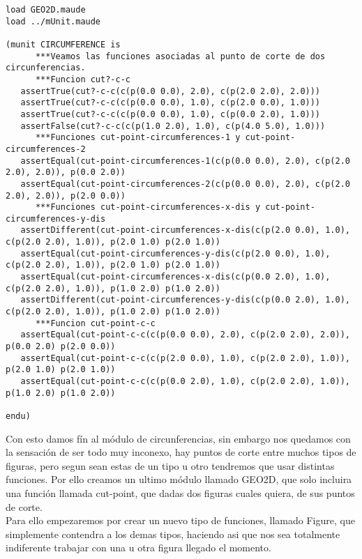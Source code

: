 \begin{verbatim}
load GEO2D.maude
load ../mUnit.maude

(munit CIRCUMFERENCE is 
      ***Veamos las funciones asociadas al punto de corte de dos circunferencias.
      ***Funcion cut?-c-c
   assertTrue(cut?-c-c(c(p(0.0 0.0), 2.0), c(p(2.0 2.0), 2.0)))
   assertTrue(cut?-c-c(c(p(0.0 0.0), 1.0), c(p(2.0 0.0), 1.0)))
   assertTrue(cut?-c-c(c(p(0.0 0.0), 1.0), c(p(0.0 2.0), 1.0)))
   assertFalse(cut?-c-c(c(p(1.0 2.0), 1.0), c(p(4.0 5.0), 1.0)))
      ***Funciones cut-point-circumferences-1 y cut-point-circumferences-2
   assertEqual(cut-point-circumferences-1(c(p(0.0 0.0), 2.0), c(p(2.0 2.0), 2.0)), p(0.0 2.0))
   assertEqual(cut-point-circumferences-2(c(p(0.0 0.0), 2.0), c(p(2.0 2.0), 2.0)), p(2.0 0.0))
      ***Funciones cut-point-circumferences-x-dis y cut-point-circumferences-y-dis
   assertDifferent(cut-point-circumferences-x-dis(c(p(2.0 0.0), 1.0), c(p(2.0 2.0), 1.0)), p(2.0 1.0) p(2.0 1.0))
   assertEqual(cut-point-circumferences-y-dis(c(p(2.0 0.0), 1.0), c(p(2.0 2.0), 1.0)), p(2.0 1.0) p(2.0 1.0))
   assertEqual(cut-point-circumferences-x-dis(c(p(0.0 2.0), 1.0), c(p(2.0 2.0), 1.0)), p(1.0 2.0) p(1.0 2.0))
   assertDifferent(cut-point-circumferences-y-dis(c(p(0.0 2.0), 1.0), c(p(2.0 2.0), 1.0)), p(1.0 2.0) p(1.0 2.0))
      ***Funcion cut-point-c-c
   assertEqual(cut-point-c-c(c(p(0.0 0.0), 2.0), c(p(2.0 2.0), 2.0)), p(0.0 2.0) p(2.0 0.0))
   assertEqual(cut-point-c-c(c(p(2.0 0.0), 1.0), c(p(2.0 2.0), 1.0)), p(2.0 1.0) p(2.0 1.0))
   assertEqual(cut-point-c-c(c(p(0.0 2.0), 1.0), c(p(2.0 2.0), 1.0)), p(1.0 2.0) p(1.0 2.0))

endu)

\end{verbatim}

Con esto damos f\'in al m\'odulo de circunferencias, sin embargo nos quedamos con la sensaci\'on de ser todo muy inconexo, hay puntos de corte entre muchos tipos de figuras, pero segun sean estas de un tipo u otro tendremos que usar distintas funciones. Por ello creamos un ultimo m\'odulo llamado GEO2D, que solo incluira una funci\'on llamada cut-point, que dadas dos figuras cuales quiera, de sus puntos de corte. \\

Para ello empezaremos por crear un nuevo tipo de funciones, llamado Figure, que simplemente contendra a los demas tipos, haciendo asi que nos sea totalmente indiferente trabajar con una u otra figura llegado el momento.\par

